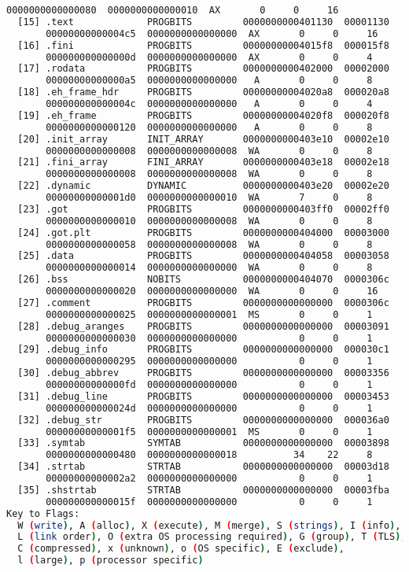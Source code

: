 \begin{lstlisting}[language=bash, caption={List of ELF section headers with readelf tool of a program compiled with GCC.}, label={code:elf_sections}]
       0000000000000080  0000000000000010  AX       0     0     16
  [15] .text             PROGBITS         0000000000401130  00001130
       00000000000004c5  0000000000000000  AX       0     0     16
  [16] .fini             PROGBITS         00000000004015f8  000015f8
       000000000000000d  0000000000000000  AX       0     0     4
  [17] .rodata           PROGBITS         0000000000402000  00002000
       00000000000000a5  0000000000000000   A       0     0     8
  [18] .eh_frame_hdr     PROGBITS         00000000004020a8  000020a8
       000000000000004c  0000000000000000   A       0     0     4
  [19] .eh_frame         PROGBITS         00000000004020f8  000020f8
       0000000000000120  0000000000000000   A       0     0     8
  [20] .init_array       INIT_ARRAY       0000000000403e10  00002e10
       0000000000000008  0000000000000008  WA       0     0     8
  [21] .fini_array       FINI_ARRAY       0000000000403e18  00002e18
       0000000000000008  0000000000000008  WA       0     0     8
  [22] .dynamic          DYNAMIC          0000000000403e20  00002e20
       00000000000001d0  0000000000000010  WA       7     0     8
  [23] .got              PROGBITS         0000000000403ff0  00002ff0
       0000000000000010  0000000000000008  WA       0     0     8
  [24] .got.plt          PROGBITS         0000000000404000  00003000
       0000000000000058  0000000000000008  WA       0     0     8
  [25] .data             PROGBITS         0000000000404058  00003058
       0000000000000014  0000000000000000  WA       0     0     8
  [26] .bss              NOBITS           0000000000404070  0000306c
       0000000000000020  0000000000000000  WA       0     0     16
  [27] .comment          PROGBITS         0000000000000000  0000306c
       0000000000000025  0000000000000001  MS       0     0     1
  [28] .debug_aranges    PROGBITS         0000000000000000  00003091
       0000000000000030  0000000000000000           0     0     1
  [29] .debug_info       PROGBITS         0000000000000000  000030c1
       0000000000000295  0000000000000000           0     0     1
  [30] .debug_abbrev     PROGBITS         0000000000000000  00003356
       00000000000000fd  0000000000000000           0     0     1
  [31] .debug_line       PROGBITS         0000000000000000  00003453
       000000000000024d  0000000000000000           0     0     1
  [32] .debug_str        PROGBITS         0000000000000000  000036a0
       00000000000001f5  0000000000000001  MS       0     0     1
  [33] .symtab           SYMTAB           0000000000000000  00003898
       0000000000000480  0000000000000018          34    22     8
  [34] .strtab           STRTAB           0000000000000000  00003d18
       00000000000002a2  0000000000000000           0     0     1
  [35] .shstrtab         STRTAB           0000000000000000  00003fba
       000000000000015f  0000000000000000           0     0     1
Key to Flags:
  W (write), A (alloc), X (execute), M (merge), S (strings), I (info),
  L (link order), O (extra OS processing required), G (group), T (TLS),
  C (compressed), x (unknown), o (OS specific), E (exclude),
  l (large), p (processor specific)
\end{lstlisting}
